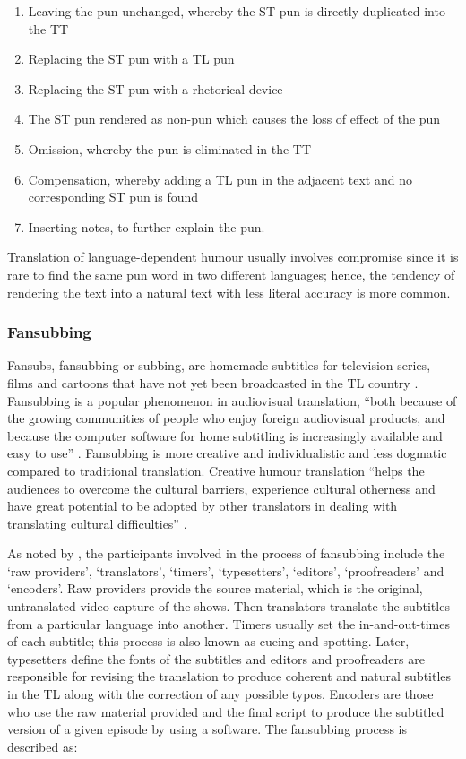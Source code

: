 \documentclass[english]{textolivre}
\begin{document}
\begin{enumerate}[label=\roman*.]
    \item Leaving the pun unchanged, whereby the ST pun is directly duplicated into the TT
    \item Replacing the ST pun with a TL pun
    \item Replacing the ST pun with a rhetorical device
    \item The ST pun rendered as non-pun which causes the loss of effect of the pun
    \item Omission, whereby the pun is eliminated in the TT
    \item Compensation, whereby adding a TL pun in the adjacent text and no corresponding ST pun is found
    \item Inserting notes, to further explain the pun.
\end{enumerate}

Translation of language-dependent humour usually involves compromise since it is rare to find the same pun word in two different languages; hence, the tendency of rendering the text into a natural text with less literal accuracy is more common.

\subsubsection{Fansubbing}\label{sec-secoes}
Fansubs, fansubbing or subbing, are homemade subtitles for television series, films and cartoons that have not yet been broadcasted in the TL country \cite{diaz-cintas_subtitling:_2013}. Fansubbing is a popular phenomenon in audiovisual translation, “both because of the growing communities of people who enjoy foreign audiovisual products, and because the computer software for home subtitling is increasingly available and easy to use” \cite[p. 117]{chaume_turn_2013}. Fansubbing is more creative and individualistic and less dogmatic compared to traditional translation. Creative humour translation “helps the audiences to overcome the cultural barriers, experience cultural otherness and have great potential to be adopted by other translators in dealing with translating cultural difficulties” \cite[p. 438]{cai_fansubbing_2015}.  

As noted by \textcite{diaz-cintas_fansubs:_2006}, the participants involved in the process of fansubbing include the `raw providers', `translators', `timers', `typesetters', `editors', `proofreaders' and `encoders'. Raw providers provide the source material, which is the original, untranslated video capture of the shows. Then translators translate the subtitles from a particular language into another. Timers usually set the in-and-out-times of each subtitle; this process is also known as cueing and spotting. Later, typesetters define the fonts of the subtitles and editors and proofreaders are responsible for revising the translation to produce coherent and natural subtitles in the TL along with the correction of any possible typos. Encoders are those who use the raw material provided and the final script to produce the subtitled version of a given episode by using a software. The fansubbing process is described as:
\end{document}

